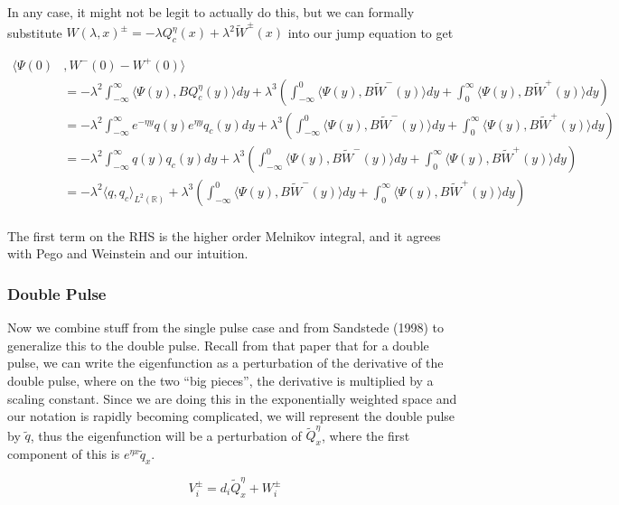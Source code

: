 \documentclass[12pt]{article}
\def\R{{\mathbb R}}
\begin{document}
In any case, it might not be legit to actually do this, but we can formally substitute $W(\lambda, x)^\pm = -\lambda Q^\eta_c(x) + \lambda^2 \tilde{W}^\pm(x)$ into our jump equation to get

\begin{align*}
\langle\Psi(0) &, W^-(0) - W^+(0)\rangle \\
&= -\lambda^2 \int_{-\infty}^\infty \langle \Psi(y), B Q^\eta_c(y) \rangle dy + \lambda^3 \left( \int_{-\infty}^0 \langle \Psi(y), B \tilde{W}^-(y) \rangle dy + \int_0^\infty \langle \Psi(y), B \tilde{W}^+(y) \rangle dy \right) \\
&= -\lambda^2 \int_{-\infty}^\infty e^{-\eta y}q(y) e^{\eta y} q_c(y) dy + \lambda^3 \left( \int_{-\infty}^0 \langle \Psi(y), B \tilde{W}^-(y) \rangle dy + \int_0^\infty \langle \Psi(y), B \tilde{W}^+(y) \rangle dy \right) \\
&= -\lambda^2 \int_{-\infty}^\infty q(y) q_c(y) dy + \lambda^3 \left( \int_{-\infty}^0 \langle \Psi(y), B \tilde{W}^-(y) \rangle dy + \int_0^\infty \langle \Psi(y), B \tilde{W}^+(y) \rangle dy \right) \\
&= -\lambda^2 \langle q, q_c \rangle_{L^2(\R)} + \lambda^3 \left( \int_{-\infty}^0 \langle \Psi(y), B \tilde{W}^-(y) \rangle dy + \int_0^\infty \langle \Psi(y), B \tilde{W}^+(y) \rangle dy \right) \\
\end{align*}

The first term on the RHS is the higher order Melnikov integral, and it agrees with Pego and Weinstein and our intuition.

\subsubsection*{Double Pulse}

Now we combine stuff from the single pulse case and from Sandstede (1998) to generalize this to the double pulse. Recall from that paper that for a double pulse, we can write the eigenfunction as a perturbation of the derivative of the double pulse, where on the two ``big pieces'', the derivative is multiplied by a scaling constant. Since we are doing this in the exponentially weighted space and our notation is rapidly becoming complicated, we will represent the double pulse by $\tilde{q}$, thus the eigenfunction will be a perturbation of $\tilde{Q}^\eta_x$, where the first component of this is $e^{\eta x} \tilde{q}_x$.

\[
V_i^\pm = d_i \tilde{Q}^\eta_x + W_i^\pm 
\]
\end{document}
